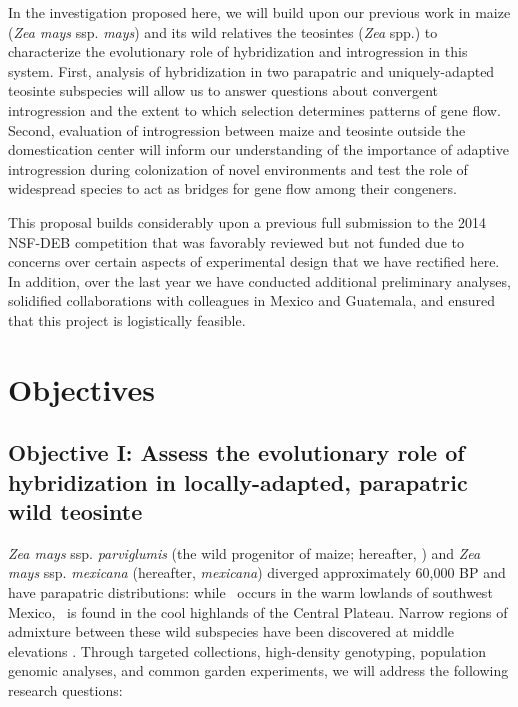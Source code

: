 In the investigation proposed here, we will build upon our previous work in maize (\emph{Zea mays} ssp. \emph{mays}) and its wild relatives the teosintes (\emph{Zea} spp.) to characterize the evolutionary role of hybridization and introgression in this system. 
First, analysis of hybridization in two parapatric and uniquely-adapted teosinte subspecies will allow us to answer questions about convergent introgression and the extent to which selection determines patterns of gene flow.
Second, evaluation of introgression between maize and teosinte outside the domestication center will inform our understanding of the importance of adaptive introgression during colonization of novel environments and test the role of widespread species to act as bridges for gene flow among their congeners.

This proposal builds considerably upon a previous full submission to the 2014 NSF-DEB competition that was favorably reviewed but not funded due to concerns over certain aspects of experimental design that we have rectified here.
In addition, over the last year we have conducted additional preliminary analyses, solidified collaborations with colleagues in Mexico and Guatemala, and ensured that this project is logistically feasible.

\section*{Objectives}
\subsection*{Objective I: Assess the evolutionary role of hybridization in locally-adapted, parapatric wild teosinte}
\emph{Zea mays} ssp. \emph{parviglumis} (the wild progenitor of maize; hereafter, \zp) and \emph{Zea mays} ssp. \emph{mexicana} (hereafter, \emph{mexicana}) diverged approximately 60,000 BP \citep{Ross-Ibarra2009a} and have parapatric distributions: while \zp\ occurs in the warm lowlands of southwest Mexico, \zm\  is found in the cool highlands of the Central Plateau. 
Narrow regions of admixture between these wild subspecies have been discovered at middle elevations \citep{Fukunaga2005, Pyhajarvi2013}. 
Through targeted collections, high-density genotyping, population genomic analyses, and common garden experiments, we will address the following research questions: 

